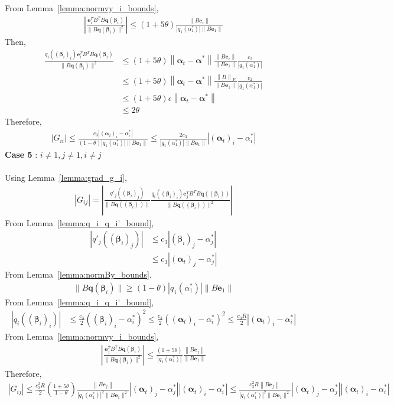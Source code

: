 \documentclass[letterpaper]{article}
\newcommand{\bas}[1]{\begin{align*}#1\end{align*}}
\newcommand{\balpha}{\pmb{\alpha}}
\newcommand{\be}{\pmb{e}}
\newcommand{\bbeta}{\pmb{\beta}}
\newcommand{\bq}{\pmb{q}}
\newcommand{\norm}[1]{\left\|#1\right\|}
\newcommand{\bb}[1]{\left(#1\right)}
\begin{document}
From Lemma~\ref{lemma:normvy_i_bounds}, 
\bas{
    \left|\frac{\be_{i}^{T}B^{T}B\bq\bb{\bbeta_{i}}}{\|B\bq\bb{\bbeta_{i}}\|^{2}}\right| \leq \bb{1+5\theta}\frac{\left\|B\be_{i}\right\|}{|q_{1}\bb{\alpha^{*}_{1}}|\|B\be_{1}\|}
}
Then, 
\bas{
    \frac{q_{i}\bb{\bb{\bbeta_{i}}_{i}}\be_{i}^{T}B^{T}B\bq\bb{\bbeta_{i}}}{\|B\bq\bb{\bbeta_{i}}\|^{2}} &\leq \bb{1+5\theta}\norm{\balpha_{t}-\balpha^{*}}\frac{\left\|B\be_{i}\right\|}{\|B\be_{1}\|}\frac{c_{2}}{|q_{1}\bb{\alpha^{*}_{1}}|} \\
    &\leq \bb{1+5\theta}\norm{\balpha_{t}-\balpha^{*}}\frac{\left\|B\right\|_{F}}{\|B\be_{1}\|}\frac{c_{2}}{|q_{1}\bb{\alpha^{*}_{1}}|} \\
    &\leq \bb{1+5\theta}\epsilon\norm{\balpha_{t}-\balpha^{*}} \\
    &\leq 2\theta
}
Therefore, 
\bas{
    \left|G_{ii}\right| \leq \frac{c_{3}\left|\bb{\balpha_{t}}_{i} - \alpha^{*}_{i}\right|}{\bb{1-\theta}\left|q_{1}\bb{\alpha^{*}_{1}}\right|\left\|B\be_{1}\right\|} \leq \frac{2c_{3}}{\left|q_{1}\bb{\alpha^{*}_{1}}\right|\left\|B\be_{1}\right\|}\left|\bb{\balpha_{t}}_{i} - \alpha^{*}_{i}\right|
}
\textbf{Case 5} : $i \neq 1, j \neq 1, i \neq j$ \\ \\ 
Using Lemma~\ref{lemma:grad_g_i},
\bas{
    \left|G_{ij}\right| = \left|\frac{q'_{j}\bb{\bb{\bbeta_{i}}_{j}}}{\|B\bq\bb{\bb{\bbeta_{i}}}\|}\frac{q_{i}\bb{\bb{\bbeta_{i}}_{i}}\be_{j}^{T}B^{T}B\bq\bb{\bb{\bbeta_{i}}}}{\|B\bq\bb{\bb{\bbeta_{i}}}\|^{2}}\right|
}
From Lemma~\ref{lemma:q_i_q_i'_bound},
\bas{
    \left|q'_{j}\bb{\bb{\bbeta_{i}}_{j}}\right| &\leq c_{3}\left|\bb{\bbeta_{i}}_{j} - \alpha^{*}_{j}\right| \\ &\leq c_{3}\left|\bb{\balpha_{t}}_{j} - \alpha^{*}_{j}\right|
}
From Lemma~\ref{lemma:normBy_bounds}, 
\bas{
    \|B\bq\bb{\bbeta_{i}}\| \geq \bb{1-\theta}\left|q_{1}\bb{\alpha^{*}_{1}}\right|\left\|B\be_{1}\right\|
}
From Lemma~\ref{lemma:q_i_q_i'_bound}, 
\bas{
    \left|q_{i}\bb{\bb{\bbeta_{i}}_{i}}\right| &\leq \frac{c_{3}}{2}\bb{\bb{\bbeta_{i}}_{i} - \alpha^{*}_{i}}^{2} \leq \frac{c_{3}}{2}\bb{\bb{\balpha_{t}}_{i} - \alpha^{*}_{i}}^{2} \leq \frac{c_{3}R}{2}|\bb{\balpha_{t}}_{i} - \alpha^{*}_{i}|
}
From Lemma~\ref{lemma:normvy_i_bounds}, 
\bas{
    \left|\frac{\be_{j}^{T}B^{T}B\bq\bb{\bbeta_{i}}}{\|B\bq\bb{\bbeta_{i}}\|^{2}}\right| \leq \frac{\bb{1+5\theta}}{|q_{1}\bb{\alpha^{*}_{1}}|}\frac{\left\|B\be_{j}\right\|}{\|B\be_{1}\|}
}
Therefore, 
\bas{
    \left|G_{ij}\right| \leq \frac{c_{3}^{2}R}{2}\bb{\frac{1+5\theta}{1-\theta}}\frac{\left\|B\be_{j}\right\|}{\left|q_{1}\bb{\alpha^{*}_{1}}\right|^{2}\|B\be_{1}\|^{2}}\left|\bb{\balpha_{t}}_{j} - \alpha^{*}_{j}\right| \left|\bb{\balpha_{t}}_{i} - \alpha^{*}_{i}\right| \leq \frac{c_{3}^{2}R\left\|B\be_{j}\right\|}{\left|q_{1}\bb{\alpha^{*}_{1}}\right|^{2}\|B\be_{1}\|^{2}}\left|\bb{\balpha_{t}}_{j} - \alpha^{*}_{j}\right| \left|\bb{\balpha_{t}}_{i} - \alpha^{*}_{i}\right|
}
\end{document}
